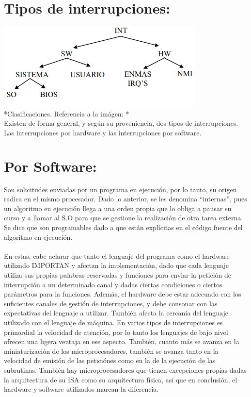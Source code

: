 \documentclass[12pt]{article}
\begin{document}
\begin{multicols}{2}
\section*{Tipos de interrupciones: }
\includegraphics[scale=0.7]{tipos de interrupciones.PNG}\\[0.5 cm]
*Clasificaciones. Referencia a la imágen: \cite{Bel}*\\
Existen de forma general, y según su proveniencia, dos tipos de interrupciones. Las interrupciones por hardware y las interrupciones por software.
\section*{Por Software: }
Son solicitudes enviadas por un programa en ejecución, por lo tanto, su origen radica en el mismo procesador. Dado lo anterior, se les denomina “internas”, pues un algoritmo en ejecución llega a una orden propia que lo obliga a pausar su curso y a llamar al S.O para que se gestione la realización de otra tarea externa. Se dice que son programables dado a que están explícitas en el código fuente del algoritmo en ejecución.\\\\
\indent En estas, cabe aclarar que tanto el lenguaje del programa como el hardware utilizado IMPORTAN y afectan la implementación, dado que cada lenguaje utiliza sus propias palabras reservadas y funciones para enviar la petición de interrupción a un determinado canal y dadas ciertas condiciones o ciertos parámetros para la funciones. Además, el hardware debe estar adecuado con los suficientes canales de gestión de interrupciones, y debe consonar con las expectativas del lenguaje a utilizar. También afecta la cercanía del lenguaje utilizado con el lenguaje de máquina. En varios tipos de interrupciones es primordial la velocidad de atención, por lo tanto los lenguajes de bajo nivel ofrecen una ligera ventaja en ese aspecto. También, cuanto más se avanza en la miniaturización de los microprocesadores, también se avanza tanto en la velocidad de emisión de las peticiónes como en la de la ejecución de las subrutinas. También hay microprocesadores que tienen excepciones propias dadas la arquitectura de su ISA como su arquitectura física, así que en conclusión, el hardware y software utilizados marcan la diferencia.

\end{multicols}
\end{document}
